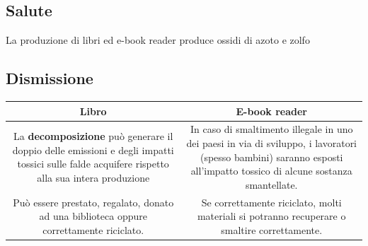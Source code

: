 \subsection{Salute}
La produzione di libri ed e-book reader produce ossidi di azoto e zolfo %

\subsection{Dismissione}
\begin{table}
	\begin{tabular}{|c|c|}
		\hline
		Libro & E-book reader \\
		\hline
		La \textbf{decomposizione} può generare il doppio delle emissioni e degli impatti tossici sulle falde acquifere rispetto alla sua intera produzione & In caso di smaltimento illegale in uno dei paesi in via di sviluppo, i lavoratori (spesso bambini) saranno esposti all'impatto tossico di alcune sostanza smantellate. \\
		Può essere prestato, regalato, donato ad una biblioteca oppure correttamente riciclato. & Se correttamente riciclato, molti materiali si potranno recuperare o smaltire correttamente.
	\end{tabular}
\end{table}
